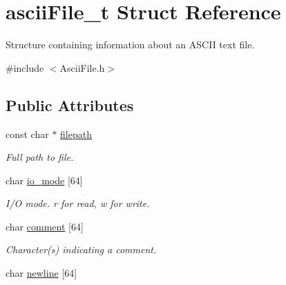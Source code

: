 \hypertarget{structasciiFile__t}{}\section{ascii\+File\+\_\+t Struct Reference}
\label{structasciiFile__t}


Structure containing information about an A\+S\+C\+II text file.  




{\ttfamily \#include $<$Ascii\+File.\+h$>$}

\subsection*{Public Attributes}
\begin{DoxyCompactItemize}
\item 
\mbox{\label{structasciiFile__t_a9141b66096494327a32fa51c6b8281cc}} 
const char $\ast$ \mbox{\hyperlink{structasciiFile__t_a9141b66096494327a32fa51c6b8281cc}{filepath}}
\begin{DoxyCompactList}\small\item\em Full path to file. \end{DoxyCompactList}\item 
\mbox{\label{structasciiFile__t_a89b8b86d814353fea003c9c54204d8af}} 
char \mbox{\hyperlink{structasciiFile__t_a89b8b86d814353fea003c9c54204d8af}{io\+\_\+mode}} \mbox{[}64\mbox{]}
\begin{DoxyCompactList}\small\item\em I/O mode. \textquotesingle{}r\textquotesingle{} for read, \textquotesingle{}w\textquotesingle{} for write. \end{DoxyCompactList}\item 
\mbox{\label{structasciiFile__t_aa6b01ebf820bd2c7bc7003e7b0669092}} 
char \mbox{\hyperlink{structasciiFile__t_aa6b01ebf820bd2c7bc7003e7b0669092}{comment}} \mbox{[}64\mbox{]}
\begin{DoxyCompactList}\small\item\em Character(s) indicating a comment. \end{DoxyCompactList}\item 
\mbox{\label{structasciiFile__t_aa98795a5f431ada3d3548bc9b29c936f}} 
char \mbox{\hyperlink{structasciiFile__t_aa98795a5f431ada3d3548bc9b29c936f}{newline}} \mbox{[}64\mbox{]}

\end{DoxyCompactItemize}
